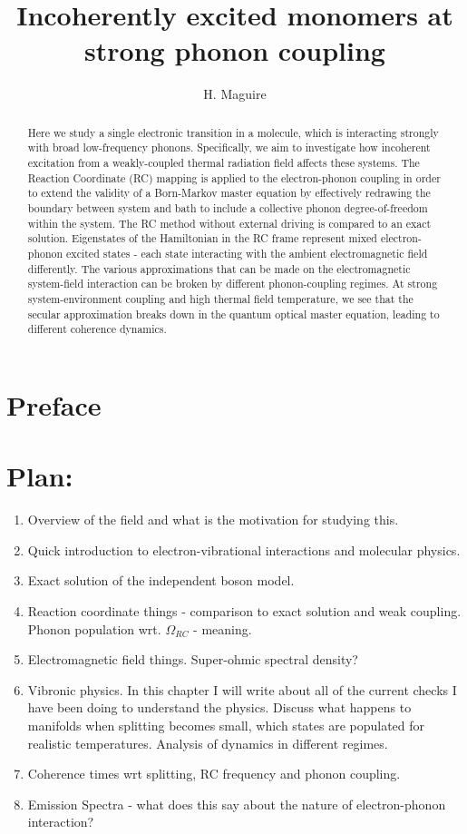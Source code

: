 \documentclass[]{article}
\title{Incoherently excited monomers at strong phonon coupling}
\author[1]{H. Maguire}
\affil[1]{Photon Science Institute and School of Physics and Astronomy, The University of Manchester, Oxford Road,
	Manchester M13 9PL, United Kingdom}
\begin{document}
\tableofcontents
\section*{Preface}

\maketitle
\begin{abstract}
Here we study a single electronic transition in a molecule, which is interacting strongly with broad low-frequency phonons. Specifically, we aim to investigate how incoherent excitation from a weakly-coupled thermal radiation field affects these systems. The Reaction Coordinate (RC) mapping is applied to the electron-phonon coupling in order to extend the validity of a Born-Markov master equation by effectively redrawing the boundary between system and bath to include a collective phonon degree-of-freedom within the system. The RC method without external driving is compared to an exact solution. Eigenstates of the Hamiltonian in the RC frame represent mixed electron-phonon excited states - each state interacting with the ambient electromagnetic field differently. The various approximations that can be made on the electromagnetic system-field interaction can be broken by different phonon-coupling regimes. At strong system-environment coupling and high thermal field temperature, we see that the secular approximation breaks down in the quantum optical master equation, leading to different coherence dynamics.
\end{abstract}
 
\section{Plan:}
\begin{enumerate}
	\item Overview of the field and what is the motivation for studying this.
	\item Quick introduction to electron-vibrational interactions and molecular physics.
	\item Exact solution of the independent boson model.
	\item Reaction coordinate things - comparison to exact solution and weak coupling. Phonon population wrt. $\Omega_{RC}$ - meaning.
	\item Electromagnetic field things. Super-ohmic spectral density?
	\item Vibronic physics. In this chapter I will write about all of the current checks I have been doing to understand the physics. Discuss what happens to manifolds when splitting becomes small, which states are populated for realistic temperatures. Analysis of dynamics in different regimes.
	\item Coherence times wrt splitting, RC frequency and phonon coupling.
	\item Emission Spectra - what does this say about the nature of electron-phonon interaction?
\end{enumerate}
\end{document}
